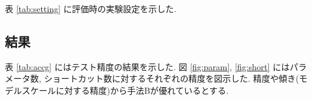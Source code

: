 \documentclass[twocolumn]{jarticle}     %
\begin{document}
表 \ref{tab:setting} に評価時の実験設定を示した.

\subsection{結果}

表 \ref{tab:accg} にはテスト精度の結果を示した.
%
図 \ref{fig:param}, \ref{fig:short} にはパラメータ数, ショートカット数に対するそれぞれの精度を図示した.
精度や傾き(モデルスケールに対する精度)から手法Bが優れているとする.
\end{document}
